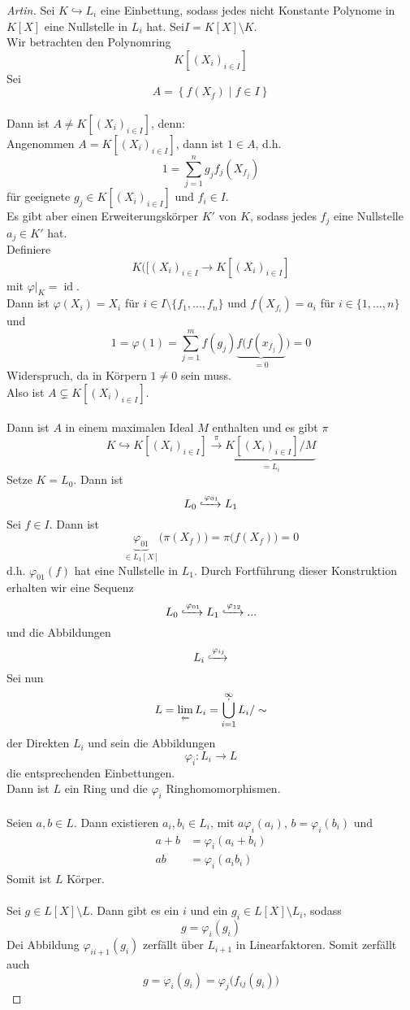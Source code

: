 \documentclass[10pt,a4paper]{article}
\newcommand{\id}{\operatorname{id}}
\renewcommand{\projlim}[1]{\lim\limits_{\overleftarrow{#1}}}
\theoremstyle{plain}
\theoremstyle{definition}
\theoremstyle{remark}
\begin{document}
	\begin{proof}[Artin]
		Sei $K\hookrightarrow L_i$ eine Einbettung, sodass jedes nicht Konstante Polynome in $K[X]$ eine Nullstelle in $L_i$ hat. Sei$I=K[X]\setminus K$.\\
		Wir betrachten den Polynomring
		\[K[(X_i)_{i\in I}]\]
		Sei
		\[A=\left\{f(X_f)\mid f\in I\right\}\]\\
		
		Dann ist $A\neq K[(X_i)_{i\in I}]$, denn:\\
		Angenommen $A=K[(X_i)_{i\in I}]$, dann ist $1\in A$, d.h.
		\[1=\sum_{j=1}^{n}g_jf_j(X_{f_j})\]
		für geeignete $g_j\in K[(X_i)_{i\in I}]$ und $f_i\in I$.\\
		Es gibt aber einen Erweiterungskörper $K'$ von $K$, sodass jedes $f_j$ eine Nullstelle $a_j\in K'$ hat.\\
		Definiere 
		\[K([(X_i)_{i\in I}\to K[(X_i)_{i\in I}]\]
		mit $\varphi|_K=\id$.\\
		Dann ist $\varphi(X_i)=X_i$ für $i\in I\setminus \{f_1,...,f_n\}$ und $f(X_{f_i})=a_i$ für $i\in\{1,...,n\}$ und
		\[1=\varphi(1)=\sum_{j=1}^{m}f(g_j)\underbrace{f\big(f(x_{f_j})}_{=0}\big)=0\]
		Widerspruch, da in Körpern $1\neq 0$ sein muss.\\
		Also ist $A\subsetneq K[(X_i)_{i\in I}]$.\\
		\\
		Dann ist $A$ in einem maximalen Ideal $M$ enthalten und es gibt $\pi$
		\[K\hookrightarrow K[(X_i)_{i\in I}]\xrightarrow{\pi}\underbrace{K[(X_i)_{i\in I}]/M}_{=L_i}\]
		Setze $K=L_0$. Dann ist
		\[L_0\xhookrightarrow{\varphi_{01}}L_1\]
		Sei $f\in I$. Dann ist
		\[\underbrace{\varphi_{01}}_{\in L_1[X]}\big(\pi(X_f)\big)=\pi\big(f(X_f)\big)=0\]
		d.h. $\varphi_{01}(f)$ hat eine Nullstelle in $L_1$. Durch Fortführung dieser Konstruktion erhalten wir eine Sequenz
		\[L_0\xhookrightarrow[]{\varphi_{01}}L_1\xhookrightarrow[]{\varphi_{12}}...\]
		und die Abbildungen
		\[L_i\xhookrightarrow[]{\varphi_{ij}}\]
		Sei nun
		\[L=\projlim{ }L_i=\operatornamewithlimits{\dot{\bigcup}}_{i=1}^\infty L_i/\sim\]
		der Direkten $L_i$ und sein die Abbildungen
		\[\varphi_i:L_i\to L\]
		die entsprechenden Einbettungen.\\
		Dann ist $L$ ein Ring und die $\varphi_i$ Ringhomomorphismen.\\
		\\
		Seien $a,b\in L$. Dann existieren $a_i,b_i\in L_i$, mit $a\varphi_i(a_i)$, $b=\varphi_i(b_i)$ und
		\begin{align*}
		a+b&=\varphi_i(a_i+b_i)\\
		ab&=\varphi_i(a_ib_i)
		\end{align*}
		Somit ist $L$ Körper.\\
		\\
		Sei $g\in L[X]\setminus L$. Dann gibt es ein $i$ und ein $g_i\in L[X]\setminus L_i$, sodass
		\[g=\varphi_i(g_i)\]
		Dei Abbildung $\varphi_{ii+1}(g_i)$ zerfällt über $L_{i+1}$ in Linearfaktoren. Somit zerfällt auch
		\[g=\varphi_i(g_i)=\varphi_{j}\big(f_{ij}(g_i)\big)\]
 	\end{proof}
 
\end{document}
